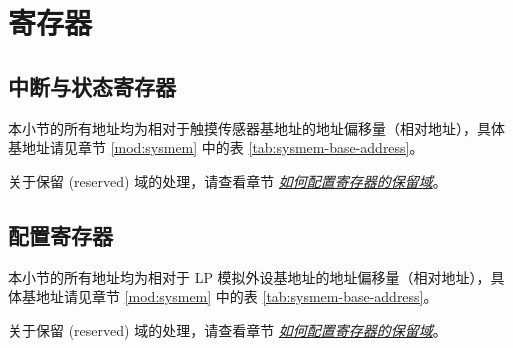 \documentclass[main\_\_CN.tex]{subfiles}
\begin{document}
\newpage
\section{寄存器}

\subsection{中断与状态寄存器}
\label{sec:tchsen-status-reg}
本小节的所有地址均为相对于触摸传感器基地址的地址偏移量（相对地址），具体基地址请见章节 \ref{mod:sysmem} \textit{} 中的表 \ref{tab:sysmem-base-address}。

关于保留 (reserved) 域的处理，请查看章节 \hyperref[programming-reserved-field]{\textit{如何配置寄存器的保留域}}。



\subsection{配置寄存器}
\label{sec:tchsen-config-reg}

本小节的所有地址均为相对于 LP 模拟外设基地址的地址偏移量（相对地址），具体基地址请见章节 \ref{mod:sysmem} \textit{} 中的表 \ref{tab:sysmem-base-address}。

关于保留 (reserved) 域的处理，请查看章节 \hyperref[programming-reserved-field]{\textit{如何配置寄存器的保留域}}。


\end{document}
